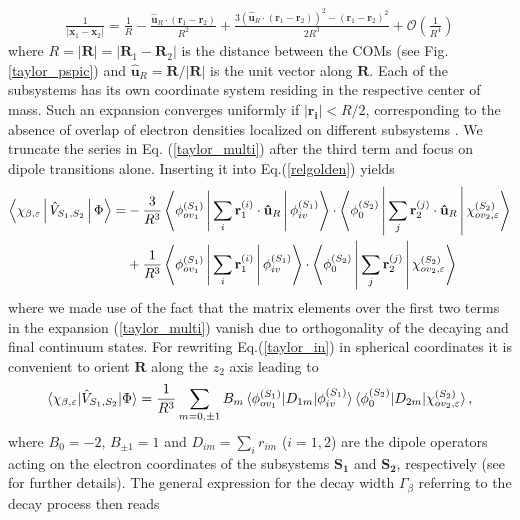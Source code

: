 \begin{align}\label{taylor_multi}
\frac{1}{\left| \mathbf{x}_1-\mathbf{x}_2 \right|} = \frac 1R - \frac{\mathbf{\hat{u}}_R \cdot (\mathbf{r}_1-\mathbf{r}_2)}{R^2}
+ \frac{3(\mathbf{\hat{u}}_R \cdot (\mathbf{r}_1-\mathbf{r}_2))^2 - (\mathbf{r}_1-\mathbf{r}_2)^2}{2R^3} + \mathcal{O} \left( \frac 1{R^4} \right)
\end{align}
where $R=|\mathbf{R}| = |\mathbf{R}_1-\mathbf{R}_2|$ is the distance between the COMs
(see Fig.\ref{taylor_pspic}) and $\mathbf{\hat{u}}_R =  \mathbf{R}/|\mathbf{R}|$ is
the unit vector along $\mathbf{R}$. Each of the subsystems has its own coordinate system
residing in the respective center of mass. Such an expansion converges uniformly
if $|\mathbf{r_i}|<R/2$, corresponding to the absence of overlap of electron
densities localized on different subsystems \cite{Ahlrichs76}. We truncate
the series in Eq. (\ref{taylor_multi}) after the third
term and focus on dipole transitions alone. Inserting it into Eq.(\ref{relgolden}) yields
\begin{align}\label{taylor_in}
\Braket{\chi_{\beta,\varepsilon}|\hat{V}_{S_1,S_2}|\Phi} 
          =&  -\frac{3}{R^3} \Braket{\phi_{ov_1}^{(S_1)}|\sum\limits_i \mathbf{r}_1^{(i)}\cdot\mathbf{\hat{u}}_R|\phi_{iv}^{(S_1)}}
           \cdot \Braket{\phi_{0}^{(S_2)}|\sum\limits_j \mathbf{r}_2^{(j)}\cdot\mathbf{\hat{u}}_R|\chi_{ov_2,\varepsilon}^{(S_2)}}
           \nonumber\\
          &+\frac{1}{R^3} \Braket{\phi_{ov_1}^{(S_1)}|\sum\limits_i \mathbf{r}_1^{(i)}|\phi_{iv}^{(S_1)}} \cdot
            \Braket{\phi_{0}^{(S_2)}|\sum\limits_j \mathbf{r}_2^{(j)}|\chi_{ov_2,\varepsilon}^{(S_2)}}
\end{align}
where we made use of the fact that the matrix elements over the first two terms
in the expansion (\ref{taylor_multi}) vanish due to orthogonality of the
decaying and final continuum states. For rewriting Eq.(\ref{taylor_in}) in
spherical coordinates it is convenient to orient $\mathbf{R}$ along the $z_2$ axis leading to
\begin{align}\label{last_matrixelement}
 \braket{\chi_{\beta,\varepsilon}|\hat{V}_{S_1,S_2}|\Phi} 
= \frac{1}{R^3} \sum\limits_{m=0,\pm 1} B_m \braket{\phi_{ov_1}^{(S_1)}|{D}_{1m}|\phi_{iv}^{(S_1)}}  \braket{\phi_{0}^{(S_2)}|{D}_{2m}|\chi_{ov_2,\varepsilon}^{(S_2)}} ,
\end{align}
where $B_0=-2$, $B_{\pm 1}=1$ and $D_{im} = \sum\limits_{i} r_{im}$ ($i=1,2$) are
the dipole operators acting on the electron coordinates of the
subsystems $\mathbf{S_1}$ and $\mathbf{S_2}$, respectively (see \cite{9} for
further details). The general expression for the decay width $\Gamma_\beta$
referring to the decay process then reads

